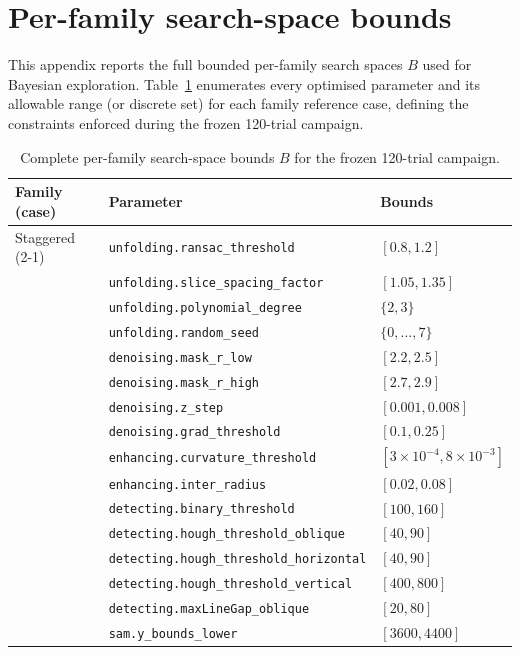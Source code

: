 \documentclass[a4paper,fleqn]{cas-dc}
\begin{document}
{\section{Per-family search-space bounds}\label{app:search-bounds}

This appendix reports the full bounded per-family search spaces $B$ used for Bayesian exploration. Table~\ref{tab:bo-bounds} enumerates every optimised parameter and its allowable range (or discrete set) for each family reference case, defining the constraints enforced during the frozen 120-trial campaign.

\begin{table}[t]
\caption{Complete per-family search-space bounds $B$ for the frozen 120-trial campaign.}\label{tab:bo-bounds}
{\small
\begin{tabular*}{\textwidth}{@{\extracolsep{\fill}} llp{} @{}}
\toprule
Family (case) & Parameter & Bounds \\
\midrule
Staggered (2-1) & \texttt{unfolding.ransac\_threshold} & $[0.8,1.2]$ \\
 & \texttt{unfolding.slice\_spacing\_factor} & $[1.05,1.35]$ \\
 & \texttt{unfolding.polynomial\_degree} & $\{2,3\}$ \\
 & \texttt{unfolding.random\_seed} & $\{0,\ldots,7\}$ \\
 & \texttt{denoising.mask\_r\_low} & $[2.2,2.5]$ \\
 & \texttt{denoising.mask\_r\_high} & $[2.7,2.9]$ \\
 & \texttt{denoising.z\_step} & $[0.001,0.008]$ \\
 & \texttt{denoising.grad\_threshold} & $[0.1,0.25]$ \\
 & \texttt{enhancing.curvature\_threshold} & $[3{\times}10^{-4},8{\times}10^{-3}]$ \\
 & \texttt{enhancing.inter\_radius} & $[0.02,0.08]$ \\
 & \texttt{detecting.binary\_threshold} & $[100,160]$ \\
 & \texttt{detecting.hough\_threshold\_oblique} & $[40,90]$ \\
 & \texttt{detecting.hough\_threshold\_horizontal} & $[40,90]$ \\
 & \texttt{detecting.hough\_threshold\_vertical} & $[400,800]$ \\
 & \texttt{detecting.maxLineGap\_oblique} & $[20,80]$ \\
 & \texttt{sam.y\_bounds\_lower} & $[3600,4400]$ \\

\end{tabular*}}
\end{table}}
\end{document}
